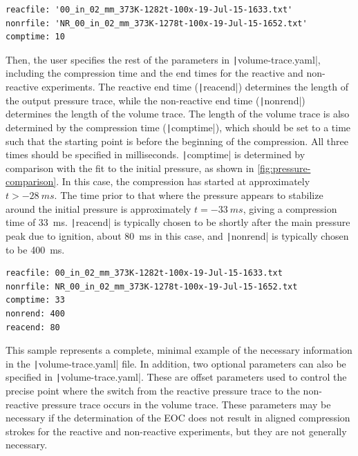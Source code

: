 \documentclass[12pt]{../ussci}
\begin{document}
\begin{verbatim}
reacfile: '00_in_02_mm_373K-1282t-100x-19-Jul-15-1633.txt'
nonrfile: 'NR_00_in_02_mm_373K-1278t-100x-19-Jul-15-1652.txt'
comptime: 10
\end{verbatim}

Then, the user specifies the rest of the parameters in
\texttt|volume-trace.yaml|, including the compression time and the end
times for the reactive and non-reactive experiments. The reactive end
time (\texttt|reacend|) determines the length of the output pressure
trace, while the non-reactive end time (\texttt|nonrend|) determines the
length of the volume trace. The length of the volume trace is also
determined by the compression time (\texttt|comptime|), which should be
set to a time such that the starting point is before the beginning of
the compression. All three times should be specified in milliseconds.
\texttt|comptime| is determined by comparison with the fit to the
initial pressure, as shown in \cref{fig:pressure-comparison}.
In this case, the compression has started at approximately
\(t > \SI{-28}{ms}\). The time prior to that where the pressure
appears to stabilize around the initial pressure is approximately
\(t = \SI{-33}{ms}\), giving a compression time of \SI{33}{\ms}.
\texttt|reacend| is typically chosen to be shortly after the main
pressure peak due to ignition, about \SI{80}{\ms} in this case, and
\texttt|nonrend| is typically chosen to be \SI{400}{\ms}.

\begin{verbatim}
reacfile: 00_in_02_mm_373K-1282t-100x-19-Jul-15-1633.txt
nonrfile: NR_00_in_02_mm_373K-1278t-100x-19-Jul-15-1652.txt
comptime: 33
nonrend: 400
reacend: 80
\end{verbatim}

This sample represents a complete, minimal example of the necessary
information in the \texttt|volume-trace.yaml| file. In addition, two
optional parameters can also be specified in \texttt|volume-trace.yaml|.
These are offset parameters used to control the precise point where the
switch from the reactive pressure trace to the non-reactive pressure
trace occurs in the volume trace. These parameters may be necessary if
the determination of the EOC does not result in aligned compression
strokes for the reactive and non-reactive experiments, but they are not
generally necessary.
\end{document}
